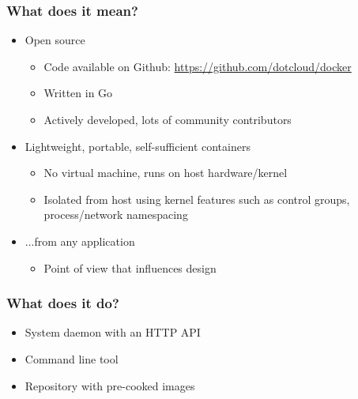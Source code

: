 \documentclass{beamer}
\begin{document}
  \begin{frame}
  	\frametitle{What does it mean?}
	\begin{itemize}  	
  		\item Open source
  	
	    \begin{itemize}
    		\item Code available on Github: \url{https://github.com/dotcloud/docker}
        	\item Written in Go
	        \item Actively developed, lots of community contributors
	    \end{itemize}
    
    \item Lightweight, portable, self-sufficient containers
    	\begin{itemize}
    		\item No virtual machine, runs on host hardware/kernel
			\item Isolated from host using kernel features such as control groups,
				process/network namespacing
	    \end{itemize}
    
    \item ...from any application
    	\begin{itemize}
    		\item Point of view that influences design
	    \end{itemize}
    \end{itemize}
    
  \end{frame}
  
  
  
  \begin{frame}
    \frametitle{What does it do?}
    \begin{itemize}
    	\item System daemon with an HTTP API
        \item Command line tool
	    \item Repository with pre-cooked images
	\end{itemize}
  \end{frame}  
  
\end{document}
